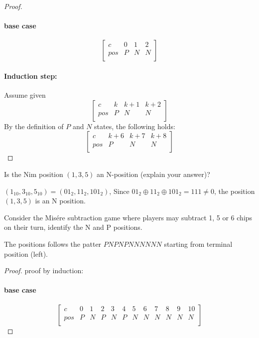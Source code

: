 \documentclass[addpoints,answers]{exam}
\begin{document}
\begin{questions}
\begin{solutionorbox}[\stretch{1}]
\begin{proof}
								\paragraph{base case}
							\[
							\begin{bmatrix}
								c   & 0 & 1 & 2 \\
								pos & P & N & N \\
							\end{bmatrix}
							\]

							\paragraph{Induction step:}Assume given 
							\[
							\begin{bmatrix}
								c   & k & k+1 & k+2\\
								pos & P & N   & N  \\
							\end{bmatrix}
							\]
							By the definition of $P$ and $N$ states, the following holds:
							\[
							\begin{bmatrix}
								c   & k+6 & k+7 & k+8\\
								pos & P   & N   & N  \\
							\end{bmatrix}
							\]
							\end{proof}
            \end{solutionorbox}
            \newpage
 
        \question
            Is the Nim position $(1, 3, 5)$ an N-position (explain your answer)?
            \begin{solutionorbox}[\stretch{1}]
							$(1_{10}, 3_{10}, 5_{10}) = (01_{2}, 11_{2}, 101_{2})$, Since
							$01_{2} \oplus 11_{2} \oplus 101_{2} = 111 \neq 0$, the position
							$(1, 3, 5)$ is an N position.
            \end{solutionorbox}
            \newpage
 
        \question
            Consider the Mis\'ere subtraction game where players may subtract 1, 5 or 6
            chips on their turn, identify the N and P positions.
            \begin{solutionorbox}[\stretch{1}]
							The positions follows the patter $PNPNPNNNNNN$ starting from
							terminal position (left).
							\begin{proof} proof by induction:
								\paragraph{base case}
							\setcounter{MaxMatrixCols}{20}
							\[
							\begin{bmatrix}
								c   & 0 & 1 & 2 & 3 & 4 & 5 & 6 & 7 & 8 & 9 & 10 \\
								pos & P & N & P & N & P & N & N & N & N & N & N  \\
							\end{bmatrix}
							\]


\end{proof}
\end{solutionorbox}
\end{questions}
\end{document}

